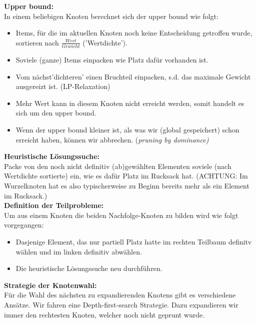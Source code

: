 \textbf{Upper bound:}\\
In einem beliebigen Knoten berechnet sich der upper bound wie folgt:
\begin{itemize}
	\item Items, für die im aktuellen Knoten noch keine Entscheidung getroffen wurde, sortieren nach $\frac{Wert}{Gewicht}$ ('Wertdichte').
	\item Soviele (ganze) Items einpacken wie Platz dafür vorhanden ist.
	\item Vom nächst'dichteren' einen Bruchteil einpacken, s.d. das maximale Gewicht ausgereizt ist. (LP-Relaxation)
	\item Mehr Wert kann in diesem Knoten nicht erreicht werden, somit handelt es sich um den upper bound.
	\item Wenn der upper bound kleiner ist, als was wir (global gespeichert) schon erreicht haben, können wir abbrechen. (\em pruning by dominance\em)
\end{itemize}

\textbf{Heuristische Lösungssuche:}\\
Packe von den noch nicht definitiv (ab)gewählten Elementen soviele (nach Wertdichte sortierte) ein, wie es dafür Platz im Rucksack hat. (ACHTUNG: Im Wurzelknoten hat es also typischerweise zu Beginn bereits mehr als ein Element im Rucksack.)\\

\textbf{Definition der Teilprobleme:}\\
Um aus einem Knoten die beiden Nachfolge-Knoten zu bilden wird wie folgt vorgegangen:
\begin{itemize}
	\item Dasjenige Element, das nur partiell Platz hatte im rechten Teilbaum definitv wählen und im linken definitiv abwählen.
	\item Die heuristische Lösungssuche neu durchführen.
\end{itemize}

\textbf{Strategie der Knotenwahl:}\\
Für die Wahl des nächsten zu expandierenden Knotens gibt es verschiedene Ansätze. Wir fahren eine Depth-first-search Strategie. Dazu expandieren wir immer den rechtesten Knoten, welcher noch nicht geprunt wurde.\\
 
